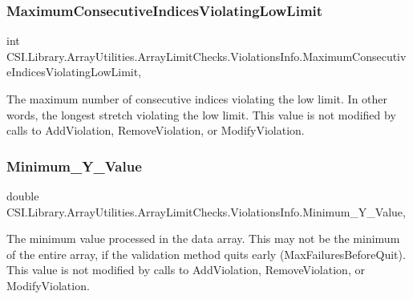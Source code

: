 \subsubsection{\texorpdfstring{MaximumConsecutiveIndicesViolatingLowLimit}{MaximumConsecutiveIndicesViolatingLowLimit}}
{\footnotesize\ttfamily int C\+S\+I.\+Library.\+Array\+Utilities.\+Array\+Limit\+Checks.\+Violations\+Info.\+Maximum\+Consecutive\+Indices\+Violating\+Low\+Limit\hspace{0.3cm}{\ttfamily [get]}, {\ttfamily [set]}}



The maximum number of consecutive indices violating the low limit. In other words, the longest stretch violating the low limit. This value is not modified by calls to Add\+Violation, Remove\+Violation, or Modify\+Violation. 

\mbox{\label{struct_c_s_i_1_1_library_1_1_array_utilities_1_1_array_limit_checks_1_1_violations_info_a1f5e002ded758075e254d8e2745fb4a8}} 
\subsubsection{\texorpdfstring{Minimum\_Y\_Value}{Minimum\_Y\_Value}}
{\footnotesize\ttfamily double C\+S\+I.\+Library.\+Array\+Utilities.\+Array\+Limit\+Checks.\+Violations\+Info.\+Minimum\+\_\+\+Y\+\_\+\+Value\hspace{0.3cm}{\ttfamily [get]}, {\ttfamily [set]}}



The minimum value processed in the data array. This may not be the minimum of the entire array, if the validation method quits early (Max\+Failures\+Before\+Quit). This value is not modified by calls to Add\+Violation, Remove\+Violation, or Modify\+Violation. 

\mbox{\label{struct_c_s_i_1_1_library_1_1_array_utilities_1_1_array_limit_checks_1_1_violations_info_a26350e4da354b988868679d7edb7f3a8}} 
